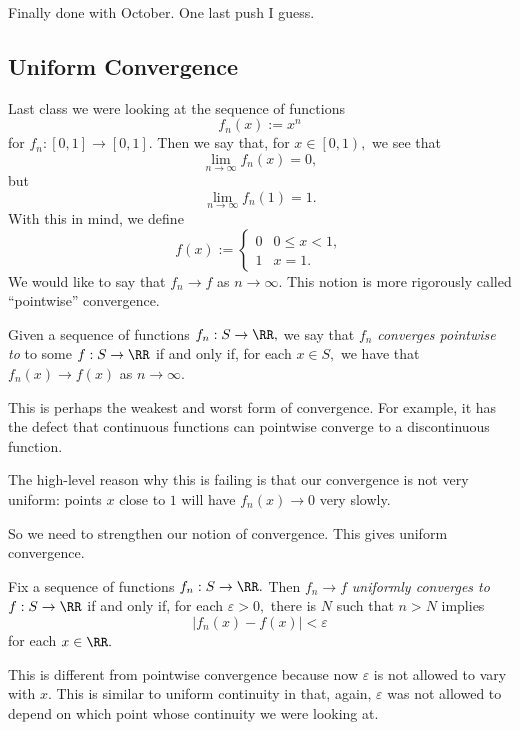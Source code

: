 \documentclass[../notes.tex]{subfiles}
\begin{document}













Finally done with October. One last push I guess.

\subsection{Uniform Convergence}
Last class we were looking at the sequence of functions
\[f_n(x):=x^n\]
for $f_n:[0,1]\to[0,1].$ Then we say that, for $x\in\left[0,1\right),$ we see that
\[\lim_{n\to\infty}f_n(x)=0,\]
but
\[\lim_{n\to\infty}f_n(1)=1.\]
With this in mind, we define
\[f(x):=\begin{cases}
	0 & 0\le x<1, \\
	1 & x=1.
\end{cases}\]
We would like to say that $f_n\to f$ as $n\to\infty.$ This notion is more rigorously called ``pointwise'' convergence.
\begin{definition}
	Given a sequence of functions $f_n:S\to\RR,$ we say that $f_n$ \textit{converges pointwise to} to some $f:S\to\RR$ if and only if, for each $x\in S,$ we have that $f_n(x)\to f(x)$ as $n\to\infty.$
\end{definition}
This is perhaps the weakest and worst form of convergence. For example, it has the defect that continuous functions can pointwise converge to a discontinuous function.
\begin{remark}
	The high-level reason why this is failing is that our convergence is not very uniform: points $x$ close to $1$ will have $f_n(x)\to0$ very slowly.
\end{remark}
So we need to strengthen our notion of convergence. This gives uniform convergence.
\begin{definition}
	Fix a sequence of functions $f_n:S\to\RR.$ Then $f_n\to f$ \textit{uniformly converges to} $f:S\to\RR$ if and only if, for each $\varepsilon>0,$ there is $N$ such that $n>N$ implies
	\[|f_n(x)-f(x)|<\varepsilon\]
	for each $x\in\RR.$
\end{definition}
This is different from pointwise convergence because now $\varepsilon$ is not allowed to vary with $x.$ This is similar to uniform continuity in that, again, $\varepsilon$ was not allowed to depend on which point whose continuity we were looking at.
\end{document}
